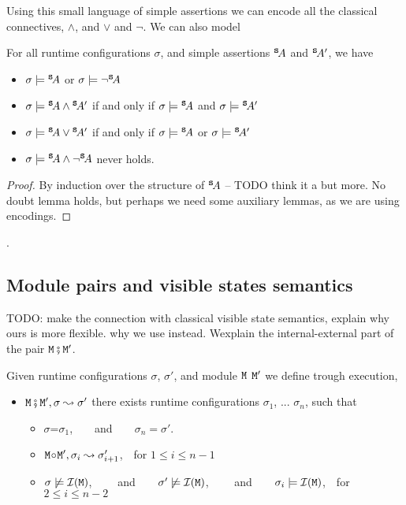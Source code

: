 Using this small language of simple assertions we can encode all the classical connectives, \ie $\wedge$, and $\vee$ and $\neg$. We can also model


\begin{lemma}
For all runtime configurations $\sigma$, and simple assertions ${^{\small{{\mbox{\tt{s}}}}}\! A}$ and ${^{\small{{\mbox{\tt{s}}}}}\! A'}$, we have
\label{lemma:simple_assertions_classical}
\begin{itemize}
\item
$\sigma \models {^{\small{{\mbox{\tt{s}}}}}\! A}$ or $\sigma \models \neg{^{\small{{\mbox{\tt{s}}}}}\! A}$
\item
$\sigma \models {^{\small{{\mbox{\tt{s}}}}}\! A} \wedge {^{\small{{\mbox{\tt{s}}}}}\! A'}$ \SP if and only if \SP $\sigma \models {^{\small{{\mbox{\tt{s}}}}}\! A}$ and  $\sigma \models {^{\small{{\mbox{\tt{s}}}}}\! A'}$ 
\item
$\sigma \models {^{\small{{\mbox{\tt{s}}}}}\! A} \vee {^{\small{{\mbox{\tt{s}}}}}\! A'}$ \SP if and only if \SP $\sigma \models {^{\small{{\mbox{\tt{s}}}}}\! A}$ or  $\sigma \models {^{\small{{\mbox{\tt{s}}}}}\! A'}$ 
\item
$\sigma \models {^{\small{{\mbox{\tt{s}}}}}\! A} \wedge \neg{^{\small{{\mbox{\tt{s}}}}}\! A}$ never holds.
\end{itemize}
\end{lemma}
\begin{proof} By induction over the structure of ${^{\small{{\mbox{\tt{s}}}}}\! A}$ -- TODO think it a but more. No doubt lemma holds, 
but perhaps we need some auxiliary lemmas, as we are using encodings. \end{proof}.


\subsection{Module pairs and visible states semantics}

TODO: make the connection with classical visible state semantics, explain why ours is more flexible. why we use  instead. Wexplain the internal-external part of the pair ${\mbox{\tt{M}}}\fatsemi{\mbox{\tt{M}}}'$.

 
\begin{definition}
Given runtime configurations $\sigma$,  $\sigma'$,  and module ${\mbox{\tt{M}}}$ ${\mbox{\tt{M}}}'$ we define  
\label{def:module_pair_execution} trough execution,
\begin{itemize}
\item
${\mbox{\tt{M}}} \fatsemi {\mbox{\tt{M}}}', \sigma \leadsto \sigma'$ \IFF  
there exists runtime configurations $\sigma_1$,  ...
$\sigma_n$, such that 
\begin{itemize}
\item
$\sigma$=$\sigma_1$,\ \  \ \ and\ \ \ \ $\sigma_n=\sigma'$.
\item
${\mbox{\tt{M}}} \!\circ\! {\mbox{\tt{M}}}', \sigma_i \leadsto \sigma_{i+1}'$,\  \  for $1\leq i \leq n\!-\!1$
\item
$\sigma \not\models {\mathcal I}({{\mbox{\tt{M}}}})$, \ \ \ \ and\ \ \ \  $\sigma' \not\models {\mathcal I}({{\mbox{\tt{M}}}})$, \ \ \ \ and\ \ \  \
$\sigma_i \models {\mathcal I}({{\mbox{\tt{M}}}})$,\ \ for $2\leq i \leq n\!-\!2$
\end{itemize}
\end{itemize}

\end{definition}

